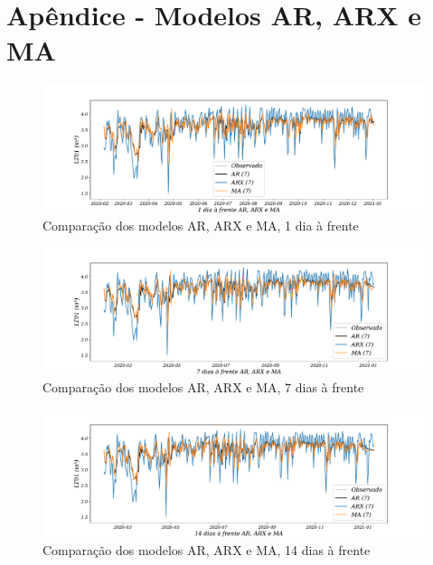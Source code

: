 
\section{Ap\^endice - Modelos AR, ARX e MA }\label{sec:ararxma24}

\begin{figure}[H]
	\centering
	\caption{Comparação dos modelos AR, ARX e MA, 1 dia à frente }
	\label{fig:1-AR-ARX-MA24}
	\includegraphics[width=1\linewidth]{Apendices/Figuras/modelagem-24h/1-AR-ARX-MA}
	
\end{figure}

\begin{figure}[!htb]
	\centering
	\caption{Comparação dos modelos AR, ARX e MA, 7 dias à frente }
	\label{fig:10-AR-ARX-MA24}
	\includegraphics[width=1\linewidth]{Apendices/Figuras/modelagem-24h/7-AR-ARX-MA}
	
\end{figure}


\begin{figure}[!htb]
	\centering
	\caption{Comparação dos modelos AR, ARX e MA, 14 dias à frente }
	\label{fig:30-AR-ARX-MA24}
	\includegraphics[width=1\linewidth]{Apendices/Figuras/modelagem-24h/14-AR-ARX-MA}
	
\end{figure}

